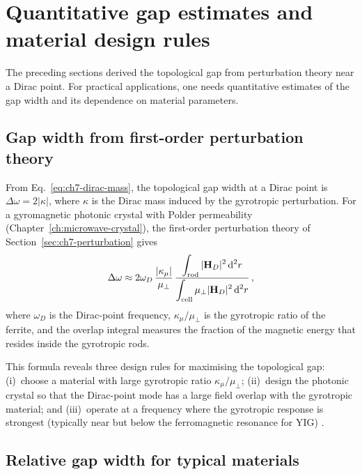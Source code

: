 \section{Quantitative gap estimates and material design rules}
\label{sec:ch7-gap-design-rules}

The preceding sections derived the topological gap from perturbation
theory near a Dirac point.  For practical applications, one needs
quantitative estimates of the gap width and its dependence on material
parameters.

\subsection{Gap width from first-order perturbation theory}
\label{sec:ch7-gap-width}

From Eq.~\eqref{eq:ch7-dirac-mass}, the topological gap width at
a Dirac point is $\Delta\omega = 2|\kappa|$, where $\kappa$ is the
Dirac mass induced by the gyrotropic perturbation.  For a
gyromagnetic photonic crystal with Polder permeability
(Chapter~\ref{ch:microwave-crystal}), the first-order perturbation
theory of Section~\ref{sec:ch7-perturbation} gives
\begin{equation}\label{eq:ch7-gap-estimate}
  \Delta\omega \approx 2\omega_D\,
  \frac{|\kappa_\mu|}{\mu_\perp}\,
  \frac{\displaystyle\int_{\mathrm{rod}}
  |\mathbf{H}_D|^2\,\mathrm{d}^2 r}
  {\displaystyle\int_{\mathrm{cell}}
  \mu_\perp|\mathbf{H}_D|^2\,\mathrm{d}^2 r}\,,
\end{equation}
where $\omega_D$ is the Dirac-point frequency, $\kappa_\mu/\mu_\perp$
is the gyrotropic ratio of the ferrite, and the overlap integral
measures the fraction of the magnetic energy that resides inside the
gyrotropic rods.

This formula reveals three design rules for maximising the topological
gap: (i)~choose a material with large gyrotropic ratio
$\kappa_\mu/\mu_\perp$; (ii)~design the photonic crystal so that
the Dirac-point mode has a large field overlap with the gyrotropic
material; and (iii)~operate at a frequency where the gyrotropic
response is strongest (typically near but below the ferromagnetic
resonance for YIG) \cite{nature2026observation,haldane2008possible}.

\subsection{Relative gap width for typical materials}
\label{sec:ch7-relative-gap}

